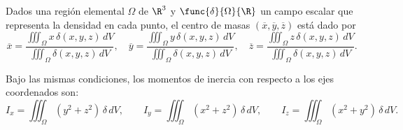\documentclass[a4,11pt]{aleph-notas}
\begin{document}
\begin{advertencia}
    Dados una región elemental $\Omega$ de $\R^3$ y $\func{\delta}{\Omega}{\R}$ un campo escalar que representa la densidad en cada punto, el centro de masas $(\overline{x},\overline{y},\overline{z})$ está dado por
    \[
        \overline{x}=
        \frac{\iiint_\Omega x\,\delta(x,y,z)\, dV}
        {\iiint_\Omega \delta(x,y,z)\, dV},
        \quad
        \overline{y}=
        \frac{\iiint_\Omega y\,\delta(x,y,z)\, dV}
        {\iiint_\Omega \delta(x,y,z)\, dV},
        \quad
        \overline{z}=
        \frac{\iiint_\Omega z\,\delta(x,y,z)\, dV}
        {\iiint_\Omega \delta(x,y,z)\, dV}.
    \]
\end{advertencia}

\begin{advertencia}
    Bajo las mismas condiciones, los momentos de inercia con respecto a los ejes coordenados son:
    \[
        I_x = \iiint_\Omega (y^2+z^2)\,\delta\, dV,
        \qquad
        I_y = \iiint_\Omega (x^2+z^2)\,\delta\, dV,
        \qquad
        I_z = \iiint_\Omega (x^2+y^2)\,\delta\, dV.
    \]
\end{advertencia}
\end{document}
